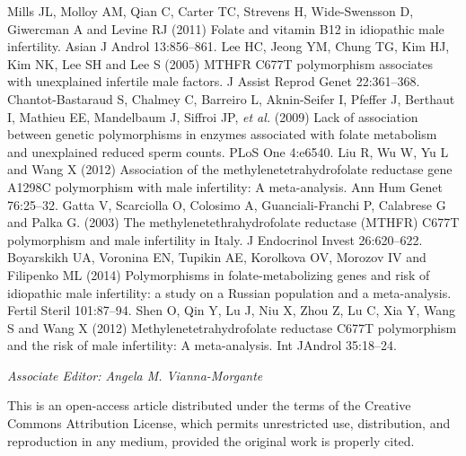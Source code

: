 \begin{biblio}[References]
 Mills JL, Molloy AM, Qian C, Carter TC, Strevens H, Wide-Swensson D, Giwercman A and Levine RJ (2011) Folate and vitamin B12 in idiopathic male infertility. Asian J Androl 13:856–861.
 Lee HC, Jeong YM, Chung TG, Kim HJ, Kim NK, Lee SH and Lee S (2005) MTHFR C677T polymorphism associates with unexplained infertile male factors. J Assist Reprod Genet 22:361–368.
 Chantot-Bastaraud S, Chalmey C, Barreiro L, Aknin-Seifer I, Pfeffer J, Berthaut I, Mathieu EE, Mandelbaum J, Siffroi JP, \textit{et al.} (2009) Lack of association between genetic polymorphisms in enzymes associated with folate metabolism and unexplained reduced sperm counts. PLoS One 4:e6540.
 Liu R, Wu W, Yu L and Wang X (2012) Association of the methylenetetrahydrofolate reductase gene A1298C polymorphism with male infertility: A meta-analysis. Ann Hum Genet 76:25–32.
 Gatta V, Scarciolla O, Colosimo A, Guanciali-Franchi P, Calabrese G and Palka G. (2003) The methylenetethrahydrofolate reductase (MTHFR) C677T polymorphism and male infertility in Italy. J Endocrinol Invest 26:620–622.
 Boyarskikh UA, Voronina EN, Tupikin AE, Korolkova OV, Morozov IV and Filipenko ML (2014) Polymorphisms in folate-metabolizing genes and risk of idiopathic male infertility: a study on a Russian population and a meta-analysis. Fertil Steril 101:87–94.
 Shen O, Qin Y, Lu J, Niu X, Zhou Z, Lu C, Xia Y, Wang S and Wang X (2012) Methylenetetrahydrofolate reductase C677T polymorphism and the risk of male infertility: A meta-analysis. Int JAndrol 35:18–24.
\end{biblio}

\medskip\par\noindent
\begin{flushright}\footnotesize{\par \textit{Associate Editor: Angela M. Vianna-Morgante}
}\end{flushright}

\medskip\par\noindent
\footnotesize{This is an open-access article distributed under the terms of the Creative Commons Attribution License, which permits unrestricted use, distribution, and reproduction in any medium, provided the original work is properly cited.}
